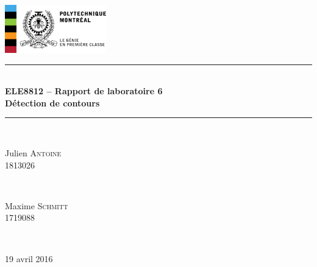\documentclass[12pt]{article}
\begin{document}
\begin{titlepage}
\newcommand{\HRule}{\rule{\linewidth}{0.5mm}} %

\centering
\includegraphics[width = 0.33\textwidth]{../../logo}\\[5cm] 
\centering
\HRule \\[0.4cm]
{ \huge \bfseries ELE8812 -- Rapport de laboratoire 6}\\[0.4cm] 
{ \LARGE \bfseries Détection de contours}\\
\HRule \\[1cm]
\begin{minipage}{0.45\textwidth}
\begin{center} 
\large
Julien \textsc{Antoine}\\
1813026
\end{center}
\end{minipage}
~
\begin{minipage}{0.45\textwidth}
\begin{center} 
\large
Maxime \textsc{Schmitt}\\
1719088
\end{center}
\end{minipage}\\[8cm]
\begin{center}
{\Large 19 avril 2016}
\end{center}
\vfill 
\end{titlepage}
\end{document}
